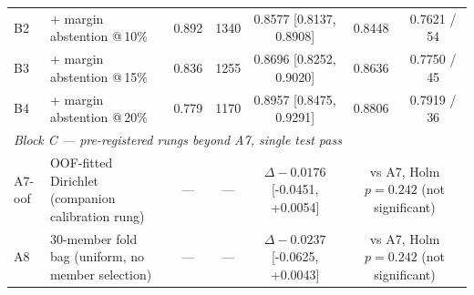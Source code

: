 \begin{table}[t]
\begin{tabular}{llccccc}
B2 & \quad + margin abstention @\,10\% & 0.892 & 1340 & 0.8577 [0.8137, 0.8908] & 0.8448 & 0.7621 / 54 \\
B3 & \quad + margin abstention @\,15\% & 0.836 & 1255 & 0.8696 [0.8252, 0.9020] & 0.8636 & 0.7750 / 45 \\
B4 & \quad + margin abstention @\,20\% & 0.779 & 1170 & 0.8957 [0.8475, 0.9291] & 0.8806 & 0.7919 / 36 \\
\midrule
\multicolumn{7}{l}{\textit{Block C --- pre-registered rungs beyond A7, single test pass}} \\
A7-oof & OOF-fitted Dirichlet (companion calibration rung) & --- & --- & $\Delta -0.0176$ [-0.0451, +0.0054] & \multicolumn{2}{c}{vs A7, Holm $p=0.242$ (not significant)} \\
A8 & 30-member fold bag (uniform, no member selection) & --- & --- & $\Delta -0.0237$ [-0.0625, +0.0043] & \multicolumn{2}{c}{vs A7, Holm $p=0.242$ (not significant)} \\
\bottomrule
\end{tabular}
\end{table}
